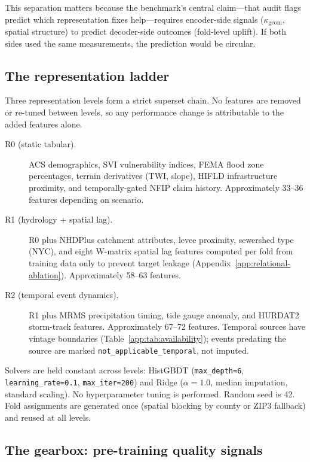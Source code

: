 This separation matters because the benchmark's central claim---that
audit flags predict which representation fixes help---requires
encoder-side signals ($\kappa_\text{geom}$, spatial structure) to
predict decoder-side outcomes (fold-level uplift). If both sides used
the same measurements, the prediction would be circular.

\subsection{The representation ladder}
\label{sec:ladder}

Three representation levels form a strict superset chain. No features
are removed or re-tuned between levels, so any performance change is
attributable to the added features alone.

\begin{description}
\item[R0 (static tabular).] ACS demographics, SVI vulnerability indices,
  FEMA flood zone percentages, terrain derivatives (TWI, slope), HIFLD
  infrastructure proximity, and temporally-gated NFIP claim history.
  Approximately 33--36 features depending on scenario.
\item[R1 (hydrology + spatial lag).] R0 plus NHDPlus catchment
  attributes, levee proximity, sewershed type (NYC), and eight W-matrix
  spatial lag features computed per fold from training data only to
  prevent target leakage (Appendix~\ref{app:relational-ablation}).
  Approximately 58--63 features.
\item[R2 (temporal event dynamics).] R1 plus MRMS precipitation timing,
  tide gauge anomaly, and HURDAT2 storm-track features. Approximately
  67--72 features. Temporal sources have vintage boundaries
  (Table~\ref{app:tab:availability}); events predating the source are
  marked \texttt{not\_applicable\_temporal}, not imputed.
\end{description}

Solvers are held constant across levels: HistGBDT
(\texttt{max\_depth=6}, \texttt{learning\_rate=0.1}, \texttt{max\_iter=200})
and Ridge ($\alpha{=}1.0$, median imputation, standard scaling). No
hyperparameter tuning is performed. Random seed is 42. Fold assignments
are generated once (spatial blocking by county or ZIP3 fallback) and
reused at all levels.

\subsection{The gearbox: pre-training quality signals}
\label{sec:gearbox}

